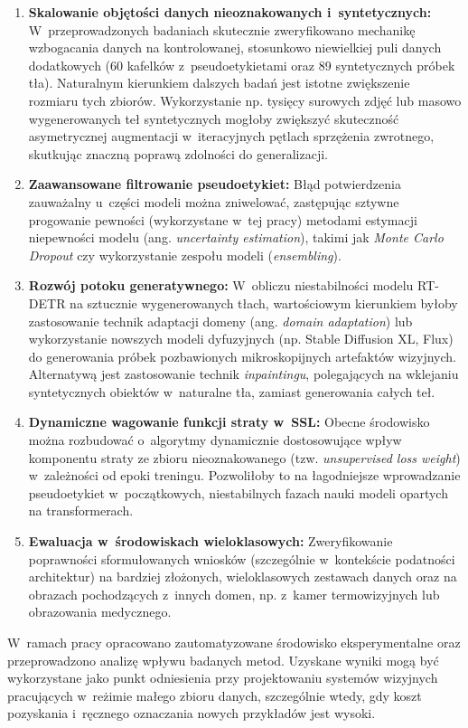 \begin{enumerate}
    \item \textbf{Skalowanie objętości danych nieoznakowanych i~syntetycznych:} W~przeprowadzonych badaniach skutecznie zweryfikowano mechanikę wzbogacania danych na kontrolowanej, stosunkowo niewielkiej puli danych dodatkowych (60 kafelków z~pseudoetykietami oraz 89 syntetycznych próbek tła). Naturalnym kierunkiem dalszych badań jest istotne zwiększenie rozmiaru tych zbiorów. Wykorzystanie np. tysięcy surowych zdjęć lub masowo wygenerowanych teł syntetycznych mogłoby zwiększyć skuteczność asymetrycznej augmentacji w~iteracyjnych pętlach sprzężenia zwrotnego, skutkując znaczną poprawą zdolności do generalizacji.
    \item \textbf{Zaawansowane filtrowanie pseudoetykiet:} Błąd potwierdzenia zauważalny u~części modeli można zniwelować, zastępując sztywne progowanie pewności (wykorzystane w~tej pracy) metodami estymacji niepewności modelu (ang. \textit{uncertainty estimation}), takimi jak \textit{Monte Carlo Dropout} czy wykorzystanie zespołu modeli (\textit{ensembling}).
    \item \textbf{Rozwój potoku generatywnego:} W~obliczu niestabilności modelu RT-DETR na sztucznie wygenerowanych tłach, wartościowym kierunkiem byłoby zastosowanie technik adaptacji domeny (ang. \textit{domain adaptation}) lub wykorzystanie nowszych modeli dyfuzyjnych (np. Stable Diffusion XL, Flux) do generowania próbek pozbawionych mikroskopijnych artefaktów wizyjnych. Alternatywą jest zastosowanie technik \textit{inpaintingu}, polegających na wklejaniu syntetycznych obiektów w~naturalne tła, zamiast generowania całych teł.
    \item \textbf{Dynamiczne wagowanie funkcji straty w~SSL:} Obecne środowisko można rozbudować o~algorytmy dynamicznie dostosowujące wpływ komponentu straty ze zbioru nieoznakowanego (tzw. \textit{unsupervised loss weight}) w~zależności od epoki treningu. Pozwoliłoby to na łagodniejsze wprowadzanie pseudoetykiet w~początkowych, niestabilnych fazach nauki modeli opartych na transformerach.
    \item \textbf{Ewaluacja w~środowiskach wieloklasowych:} Zweryfikowanie poprawności sformułowanych wniosków (szczególnie w~kontekście podatności architektur) na bardziej złożonych, wieloklasowych zestawach danych oraz na obrazach pochodzących z~innych domen, np. z~kamer termowizyjnych lub obrazowania medycznego.
\end{enumerate}

W~ramach pracy opracowano zautomatyzowane środowisko eksperymentalne oraz przeprowadzono analizę wpływu badanych metod. Uzyskane wyniki mogą być wykorzystane jako punkt odniesienia przy projektowaniu systemów wizyjnych pracujących w~reżimie małego zbioru danych, szczególnie wtedy, gdy koszt pozyskania i~ręcznego oznaczania nowych przykładów jest wysoki.
